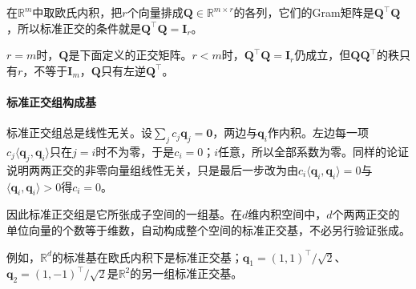 在$\mathbb R^m$中取欧氏内积，把$r$个向量排成$\bm Q\in\mathbb R^{m\times r}$的各列，它们的Gram矩阵是$\bm Q^\top\bm Q$，所以标准正交的条件就是$\bm Q^\top\bm Q=\bm I_r$。

$r=m$时，$\bm Q$是下面定义的正交矩阵。$r<m$时，$\bm Q^\top\bm Q=\bm I_r$仍成立，但$\bm Q\bm Q^\top$的秩只有$r$，不等于$\bm I_m$，$\bm Q$只有左逆$\bm Q^\top$。

\paragraph{标准正交组构成基}
标准正交组总是线性无关。设$\sum_jc_j\bm q_j=\bm0$，两边与$\bm q_i$作内积。左边每一项$c_j\langle\bm q_j,\bm q_i\rangle$只在$j=i$时不为零，于是$c_i=0$；$i$任意，所以全部系数为零。同样的论证说明两两正交的非零向量组线性无关，只是最后一步改为由$c_i\langle\bm q_i,\bm q_i\rangle=0$与$\langle\bm q_i,\bm q_i\rangle>0$得$c_i=0$。

因此标准正交组是它所张成子空间的一组基。在$d$维内积空间中，$d$个两两正交的单位向量的个数等于维数，自动构成整个空间的标准正交基，不必另行验证张成。

例如，$\mathbb R^d$的标准基在欧氏内积下是标准正交基；$\bm q_1=(1,1)^\top/\sqrt2$、$\bm q_2=(1,-1)^\top/\sqrt2$是$\mathbb R^2$的另一组标准正交基。

